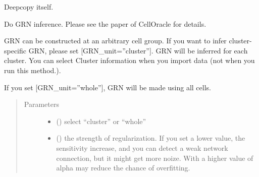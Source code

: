 \documentclass[letterpaper,10pt,english]{sphinxmanual}
\begin{document}
\begin{fulllineitems}
\begin{fulllineitems}
\end{fulllineitems}


\begin{fulllineitems}
\label{\detokenize{modules/celloracle:celloracle.Oracle.copy}}
Deepcopy itself.

\end{fulllineitems}


\begin{fulllineitems}
\label{\detokenize{modules/celloracle:celloracle.Oracle.fit_GRN_for_simulation}}
Do GRN inference.
Please see the paper of CellOracle for details.

GRN can be constructed at an arbitrary cell group.
If you want to infer cluster-specific GRN, please set {[}GRN\_unit=”cluster”{]}.
GRN will be inferred for each cluster. You can select Cluster information when you import data (not when you run this method.).

If you set {[}GRN\_unit=”whole”{]}, GRN will be made using all cells.
\begin{quote}\begin{description}
\item[{Parameters}] \leavevmode\begin{itemize}
\item {} 
 () \textendash{} select “cluster” or “whole”

\item {} 
 () \textendash{} the strength of regularization.
If you set a lower value, the sensitivity increase, and you can detect a weak network connection, but it might get more noize.
With a higher value of alpha may reduce the chance of overfitting.

\end{itemize}

\end{description}\end{quote}


\end{fulllineitems}
\end{fulllineitems}
\end{document}
